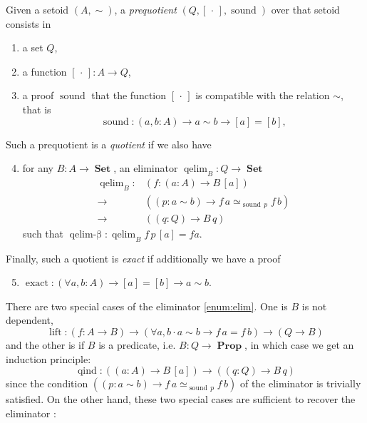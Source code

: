 \documentclass[envcountsame]{llncs}
\newcommand{\dotph}{\,\cdot\,} %
\providecommand{\class}[1]{[#1]}
\DeclareMathOperator{\Prop}{\mathbf{Prop}}
\DeclareMathOperator{\Set}{\mathbf{Set}}
\DeclareMathOperator{\sound}{sound}
\DeclareMathOperator{\qelimbeta}{qelim-\beta}
\DeclareMathOperator{\qind}{qind}
\DeclareMathOperator{\exact}{exact}
\DeclareMathOperator{\qelim}{qelim}
\DeclareMathOperator{\lift}{lift}
\renewcommand{\equiv}{=}
\begin{document}
\begin{definition}
\label{def:quotient}

\noindent
Given a setoid $(A,\sim)$,  a \emph{prequotient} $(Q,\class\dotph,\sound)$ over that setoid consists in
\begin{enumerate}
\item \label{enum:Q} a set $Q$,
\item \label{enum:box}a function $\class\dotph\colon A \to Q$,
\item \label{enum:sound} a proof $\sound$ that  the function $\class\dotph$ is compatible with the relation $\sim$,
that is \[\sound\colon (a,b : A) \to a\sim b \to [a] = [b],\]
\end{enumerate}
Such a prequotient is a \emph{quotient} if  we also have\begin{enumerate}
\setcounter{enumi}{3}
\item \label{enum:elim}   
for any $B\colon A\to\Set$, an eliminator $\qelim_B: Q\to\Set$
 \begin{align*}
 \qelim_B\colon &(f\colon (a:A) \to B\,\class a) \\
        {\to}\, &((p:a\sim b) \to f\,a \simeq_{\sound\,p}f\,b)\\
        {\to}\, &((q:Q) \to B\,q)
 \end{align*}
such that $\qelimbeta\colon \qelim_B f \,p\,\class a\equiv f a$.

\end{enumerate}
Finally, such a quotient is \emph{exact} if additionally
we have
a proof\begin{enumerate}
\setcounter{enumi}{4}
\item $\exact :(\forall a,b : A) \to  \class a \equiv \class b \to a \sim b$.

\end{enumerate}
\end{definition}

There are two special cases of the eliminator \ref{enum:elim}. One is $B$ is not dependent,
 \[\lift\colon (f\colon A \to B) \to (\forall a,b\cdot a\sim b \to f\,a \equiv f\,b) \to (Q \to B)\]
and the other is if $B$ is a predicate, i.e. $B : Q\to \Prop$, in which case we get an induction principle:
\[\qind \colon((a\colon A)\to B \,\class a)\to ((q\colon Q)\to B\,q)\]
since the condition $((p:a\sim b) \to f\,a \simeq_{\sound\,p}f\,b) $  of  the eliminator is trivially satisfied.
On the other hand, these two special cases are sufficient to recover the eliminator :
\end{document}
